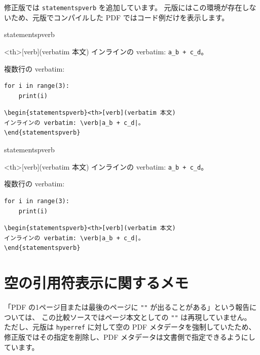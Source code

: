 \documentclass{ltjsarticle}
\begin{document}
修正版では \texttt{statementspverb} を追加しています。
元版にはこの環境が存在しないため、元版でコンパイルした PDF ではコード例だけを表示します。

\begin{codeblock}
\ifcsname statementspverb\endcsname
\begin{statementspverb}<th>[verb](verbatim 本文)
インラインの verbatim: \verb|a_b + c_d|。

複数行の verbatim:
\begin{verbatim}
for i in range(3):
    print(i)
\end{verbatim}
\end{statementspverb}

\else
\begin{verbatim}
\begin{statementspverb}<th>[verb](verbatim 本文)
インラインの verbatim: \verb|a_b + c_d|。
\end{statementspverb}
\end{verbatim}
\fi
\end{codeblock}

\ifcsname statementspverb\endcsname
\begin{statementspverb}<th>[verb](verbatim 本文)
インラインの verbatim: \verb|a_b + c_d|。

複数行の verbatim:
\begin{verbatim}
for i in range(3):
    print(i)
\end{verbatim}
\end{statementspverb}

\else
\begin{verbatim}
\begin{statementspverb}<th>[verb](verbatim 本文)
インラインの verbatim: \verb|a_b + c_d|。
\end{statementspverb}
\end{verbatim}
\fi

\section{空の引用符表示に関するメモ}

「PDF の1ページ目または最後のページに \texttt{""} が出ることがある」という報告については、
この比較ソースではページ本文としての \texttt{""} は再現していません。
ただし、元版は \texttt{hyperref} に対して空の PDF メタデータを強制していたため、
修正版ではその指定を削除し、PDF メタデータは文書側で指定できるようにしています。
\end{document}

